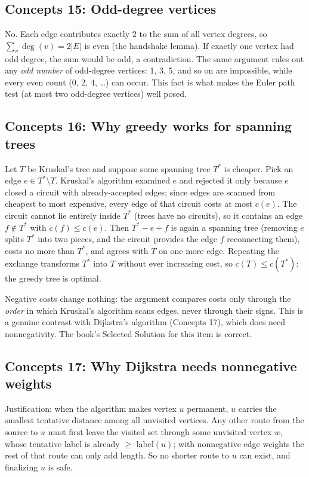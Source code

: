 \subsection*{Concepts 15: Odd-degree vertices}

No. Each edge contributes exactly 2 to the sum of all vertex degrees, so $\sum_v \deg(v) = 2|E|$ is even (the handshake lemma). If exactly one vertex had odd degree, the sum would be odd, a contradiction. The same argument rules out any \emph{odd number} of odd-degree vertices: 1, 3, 5, and so on are impossible, while every even count (0, 2, 4, \dots) can occur. This fact is what makes the Euler path test (at most two odd-degree vertices) well posed.

\subsection*{Concepts 16: Why greedy works for spanning trees}

Let $T$ be Kruskal's tree and suppose some spanning tree $T^*$ is cheaper. Pick an edge $e \in T^* \setminus T$. Kruskal's algorithm examined $e$ and rejected it only because $e$ closed a circuit with already-accepted edges; since edges are scanned from cheapest to most expensive, every edge of that circuit costs at most $c(e)$. The circuit cannot lie entirely inside $T^*$ (trees have no circuits), so it contains an edge $f \notin T^*$ with $c(f) \leq c(e)$. Then $T^* - e + f$ is again a spanning tree (removing $e$ splits $T^*$ into two pieces, and the circuit provides the edge $f$ reconnecting them), costs no more than $T^*$, and agrees with $T$ on one more edge. Repeating the exchange transforms $T^*$ into $T$ without ever increasing cost, so $c(T) \leq c(T^*)$: the greedy tree is optimal.

Negative costs change nothing: the argument compares costs only through the \emph{order} in which Kruskal's algorithm scans edges, never through their signs. This is a genuine contrast with Dijkstra's algorithm (Concepts 17), which does need nonnegativity. The book's Selected Solution for this item is correct.

\subsection*{Concepts 17: Why Dijkstra needs nonnegative weights}

Justification: when the algorithm makes vertex $u$ permanent, $u$ carries the smallest tentative distance among all unvisited vertices. Any other route from the source to $u$ must first leave the visited set through some unvisited vertex $w$, whose tentative label is already $\geq$ label$(u)$; with nonnegative edge weights the rest of that route can only add length. So no shorter route to $u$ can exist, and finalizing $u$ is safe.

